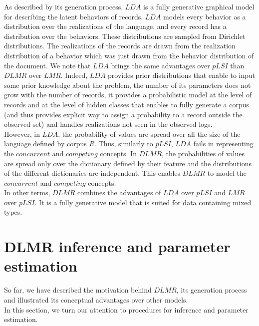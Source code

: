 As described by its generation process, $LDA$ is a fully generative graphical model for describing the latent behaviors of records. $LDA$ models every behavior as a distribution over the realizations of the language, and every record has a distribution over the behaviors. These distributions are sampled from Dirichlet distributions. The realizations of the records are drawn from the realization distribution of a behavior which was just drawn from the behavior distribution of the document. We note that $LDA$ brings the same advantages over $pLSI$ than $DLMR$ over $LMR$. Indeed, $LDA$ provides prior distributions that enable to input some prior knowledge about the problem, the number of its parameters does not grow with the number of records, it provides a probabilistic model at the level of records and at the level of hidden classes that enables to fully generate a corpus (and thus provides explicit way to assign a probability to a record outside the observed set) and handles realizations not seen in the observed logs.
\\However, in $LDA$, the probability of values are spread over all the size of the language defined by corpus $R$. Thus, similarly to $pLSI$, $LDA$ fails in representing the $concurrent$ and $competing$ concepts. In $DLMR$, the probabilities of values are spread only over the dictionary defined by their feature and the distributions of the different dictionaries are independent. This enables $DLMR$ to model the $concurrent$ and $competing$ concepts.
\\In other terms, $DLMR$ combines the advantages of $LDA$ over $pLSI$ and $LMR$ over $pLSI$. It is a fully generative model that is suited for data containing mixed types.


\section{DLMR inference and parameter estimation}

So far, we have described the motivation behind $DLMR$, its generation process and illustrated its conceptual advantages over other models.
\\In this section, we turn our attention to procedures for inference and parameter estimation.

